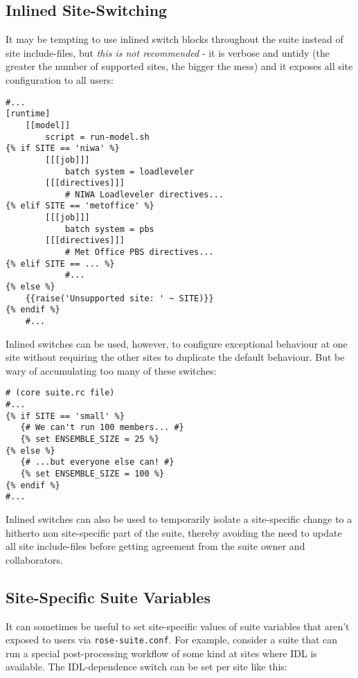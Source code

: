 \subsection{Inlined Site-Switching}
\label{Inlined Site-Switching}

It may be tempting to use inlined switch blocks throughout the suite instead of
site include-files, but {\em this is not recommended} - it is verbose and
untidy (the greater the number of supported sites, the bigger the
mess) and it exposes all site configuration to all users:

\lstset{language=suiterc}
\begin{lstlisting}
#...
[runtime]
    [[model]]
        script = run-model.sh
{% if SITE == 'niwa' %}
        [[[job]]]
            batch system = loadleveler
        [[[directives]]]
            # NIWA Loadleveler directives...
{% elif SITE == 'metoffice' %}
        [[[job]]]
            batch system = pbs
        [[[directives]]]
            # Met Office PBS directives...
{% elif SITE == ... %}
            #...
{% else %}
    {{raise('Unsupported site: ' ~ SITE)}}
{% endif %}
    #...
\end{lstlisting}

Inlined switches can be used, however, to configure exceptional behaviour at
one site without requiring the other sites to duplicate the default behaviour.
But be wary of accumulating too many of these switches:

\lstset{language=suiterc}
\begin{lstlisting}
# (core suite.rc file)
#...
{% if SITE == 'small' %}
   {# We can't run 100 members... #}
   {% set ENSEMBLE_SIZE = 25 %}
{% else %}
   {# ...but everyone else can! #}
   {% set ENSEMBLE_SIZE = 100 %}
{% endif %}
#...
\end{lstlisting}

Inlined switches can also be used to temporarily isolate a site-specific
change to a hitherto non site-specific part of the suite, thereby avoiding the
need to update all site include-files before getting agreement from the suite
owner and collaborators.

\subsection{Site-Specific Suite Variables}

It can sometimes be useful to set site-specific values of suite variables that
aren't exposed to users via \lstinline=rose-suite.conf=. For example, consider
a suite that can run a special post-processing workflow of some kind at sites
where IDL is available. The IDL-dependence switch can be set per site like this: 

